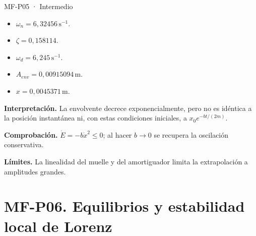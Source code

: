 \begin{studiumworked}{MF-P05 · Intermedio}
\begin{itemize}
\item $\omega_n=6{,}32456\,\mathrm{s^{-1}}$.

\item $\zeta=0{,}158114$.

\item $\omega_d=6{,}245\,\mathrm{s^{-1}}$.

\item $A_{env}=0{,}00915094\,\mathrm{m}$.

\item $x=0{,}0045371\,\mathrm{m}$.

\end{itemize}

\textbf{Interpretación.} La envolvente decrece exponencialmente, pero no es idéntica a la posición instantánea ni, con estas condiciones iniciales, a $x_0e^{-bt/(2m)}$.

\textbf{Comprobación.} $\dot E=-b\dot x^2\le0$; al hacer $b\to0$ se recupera la oscilación conservativa.

\textbf{Límites.} La linealidad del muelle y del amortiguador limita la extrapolación a amplitudes grandes.

\end{studiumworked}



\Needspace{.30\textheight}\section{MF-P06. Equilibrios y estabilidad local de Lorenz}

